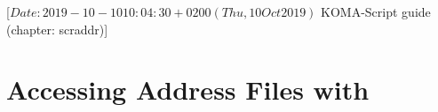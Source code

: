 %
%
%
%
%
%
%
%
% 
%
%
%
%

                 [$Date: 2019-10-10 10:04:30 +0200 (Thu, 10 Oct 2019) $
                  KOMA-Script guide (chapter: scraddr)]


\chapter{Accessing Address Files with }%
%
\BeginIndexGroup
{}

